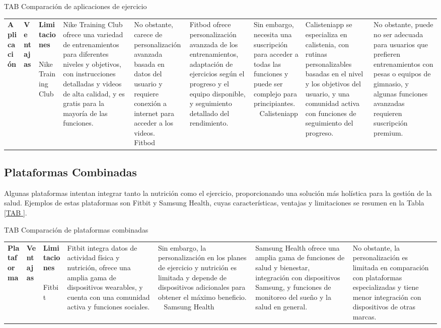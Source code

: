 \begin{table}[Comparación de aplicaciones de ejercicio]{TAB
}{Comparación de aplicaciones de ejercicio}
\begin{tabular}{|p{3cm}|p{5cm}|p{5cm}|}
\hline
\textbf{Aplicación} & \textbf{Ventajas} & \textbf{Limitaciones} \
\hline
Nike Training Club & Nike Training Club ofrece una variedad de entrenamientos para diferentes niveles y objetivos, con instrucciones detalladas y videos de alta calidad, y es gratis para la mayoría de las funciones. & No obstante, carece de personalización avanzada basada en datos del usuario y requiere conexión a internet para acceder a los videos. \
\hline
Fitbod & Fitbod ofrece personalización avanzada de los entrenamientos, adaptación de ejercicios según el progreso y el equipo disponible, y seguimiento detallado del rendimiento. & Sin embargo, necesita una suscripción para acceder a todas las funciones y puede ser complejo para principiantes. \
\hline
Calisteniapp & Calisteniapp se especializa en calistenia, con rutinas personalizables basadas en el nivel y los objetivos del usuario, y una comunidad activa con funciones de seguimiento del progreso. & No obstante, puede no ser adecuada para usuarios que prefieren entrenamientos con pesas o equipos de gimnasio, y algunas funciones avanzadas requieren suscripción premium. \
\hline
\end{tabular}
\end{table}

\subsection{Plataformas Combinadas}

Algunas plataformas intentan integrar tanto la nutrición como el ejercicio, proporcionando una solución más holística para la gestión de la salud. Ejemplos de estas plataformas son Fitbit y Samsung Health, cuyas características, ventajas y limitaciones se resumen en la Tabla \ref{TAB
}.

\begin{table}[Comparación de plataformas combinadas]{TAB
}{Comparación de plataformas combinadas}
\begin{tabular}{|p{3cm}|p{5cm}|p{5cm}|}
\hline
\textbf{Plataforma} & \textbf{Ventajas} & \textbf{Limitaciones} \
\hline
Fitbit & Fitbit integra datos de actividad física y nutrición, ofrece una amplia gama de dispositivos wearables, y cuenta con una comunidad activa y funciones sociales. & Sin embargo, la personalización en los planes de ejercicio y nutrición es limitada y depende de dispositivos adicionales para obtener el máximo beneficio. \
\hline
Samsung Health & Samsung Health ofrece una amplia gama de funciones de salud y bienestar, integración con dispositivos Samsung, y funciones de monitoreo del sueño y la salud en general. & No obstante, la personalización es limitada en comparación con plataformas especializadas y tiene menor integración con dispositivos de otras marcas. \
\hline
\end{tabular}
\end{table}

